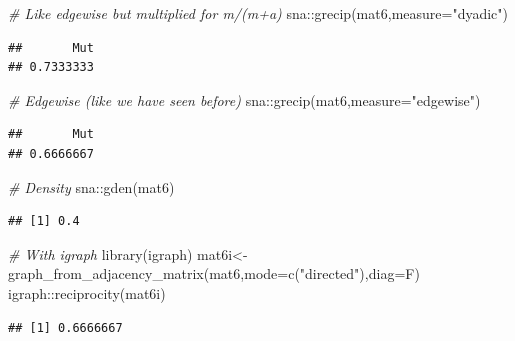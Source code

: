 \documentclass[
  notitlepage,
  onecolumn,
  openany]{book}
\newenvironment{Shaded}{\begin{snugshade}}{\end{snugshade}}
\newcommand{\AttributeTok}[1]{\textcolor[rgb]{0.77,0.63,0.00}{#1}}
\newcommand{\CommentTok}[1]{\textcolor[rgb]{0.56,0.35,0.01}{\textit{#1}}}
\newcommand{\FunctionTok}[1]{\textcolor[rgb]{0.00,0.00,0.00}{#1}}
\newcommand{\NormalTok}[1]{#1}
\newcommand{\OtherTok}[1]{\textcolor[rgb]{0.56,0.35,0.01}{#1}}
\newcommand{\SpecialCharTok}[1]{\textcolor[rgb]{0.00,0.00,0.00}{#1}}
\newcommand{\StringTok}[1]{\textcolor[rgb]{0.31,0.60,0.02}{#1}}
\begin{document}
\begin{Shaded}
\begin{Highlighting}[]
\CommentTok{\# Like edgewise but multiplied for m/(m+a)}
\NormalTok{sna}\SpecialCharTok{::}\FunctionTok{grecip}\NormalTok{(mat6,}\AttributeTok{measure=}\StringTok{"dyadic"}\NormalTok{)}
\end{Highlighting}
\end{Shaded}

\begin{verbatim}
##       Mut 
## 0.7333333
\end{verbatim}

\begin{Shaded}
\begin{Highlighting}[]
\CommentTok{\# Edgewise (like we have seen before)}
\NormalTok{sna}\SpecialCharTok{::}\FunctionTok{grecip}\NormalTok{(mat6,}\AttributeTok{measure=}\StringTok{"edgewise"}\NormalTok{)}
\end{Highlighting}
\end{Shaded}

\begin{verbatim}
##       Mut 
## 0.6666667
\end{verbatim}

\begin{Shaded}
\begin{Highlighting}[]
\CommentTok{\# Density}
\NormalTok{sna}\SpecialCharTok{::}\FunctionTok{gden}\NormalTok{(mat6)}
\end{Highlighting}
\end{Shaded}

\begin{verbatim}
## [1] 0.4
\end{verbatim}

\begin{Shaded}
\begin{Highlighting}[]
\CommentTok{\# With igraph}
\FunctionTok{library}\NormalTok{(igraph)}
\NormalTok{mat6i}\OtherTok{\textless{}{-}}\FunctionTok{graph\_from\_adjacency\_matrix}\NormalTok{(mat6,}\AttributeTok{mode=}\FunctionTok{c}\NormalTok{(}\StringTok{"directed"}\NormalTok{),}\AttributeTok{diag=}\NormalTok{F)}
\NormalTok{igraph}\SpecialCharTok{::}\FunctionTok{reciprocity}\NormalTok{(mat6i)}
\end{Highlighting}
\end{Shaded}

\begin{verbatim}
## [1] 0.6666667
\end{verbatim}
\end{document}
